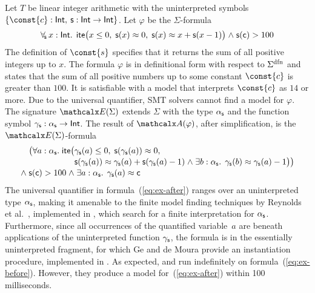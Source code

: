 
\begin{example}
\label{ex:translation}
Let $T$ be linear integer arithmetic
with the uninterpreted symbols  $\{ \const{c} : { \typeint },\allowbreak\> \con{s} : { \typeint \rightarrow \typeint } \}$.
Let $\varphi$ be the $\Sigma$-formula
\begin{equation} \label{eq:ex-before}
\forallf{\con{s}} x : {\typeint}.\;\, \lite\bigl( x \leq 0,\; \con{s}(x) \teq 0,\;
  \con{s}( x ) \teq x + \con{s}( x - 1 ) \bigr) \wedge \con{s}( \con{c} ) > 100
\end{equation}
%
The definition of $\const{s}$ specifies that it returns the sum of all
positive integers up to $x$. The formula $\varphi$ is in definitional form with
respect to $\sfundefs{\Sigma}$
and states that the sum of all
positive numbers up to some constant $\const{c}$ is greater than $100$. It is
satisfiable with a model that interprets $\const{c}$ as $14$ or more.
Due to the universal quantifier, SMT solvers
cannot find
a model for $\varphi$. The signature $\extendsig{\Sigma}$ extends $\Sigma$ with the type
$\alpha_{\mathsf{s}}$ and the %
function symbol $\gamma_{\mathsf{s}} : \alpha_{\mathsf{s}}
\rightarrow \mathsf{Int}$. The result of $\conv( \varphi )$, after simplification,
is the $\extendsig{\Sigma}$-formula
%
\begin{equation} \label{eq:ex-after}
\!\begin{aligned}[c]
  & \phantom{{\wedge}\; }\bigl(
      \forall a : \fargtype{\con{s}}.\; \lite\bigl(
        \!\begin{aligned}[t]
         &  \farg{\con{s}}( a ) \leq 0,\;
          \con{s}(\farg{\con{s}}( a )) \teq 0,\;
\\[-\jot]
  & \con{s}(\farg{\con{s}}( a )) \teq \farg{\con{s}}( a ) + \con{s}( \farg{\con{s}}( a )-1 )
    \wedge \exists b : {\fargtype{\con{s}}}.\;\, \farg{\con{s}}( b ) \teq \farg{\con{s}}( a )-1 \bigr) \bigr)
\end{aligned}
\\[-\jot]
 & {\wedge}\; \con{s}( \con{c} ) > 100 \wedge \exists a : {\fargtype{\con{s}}}.\;\, \farg{\con{s}}( a ) \teq \con{c}
\end{aligned}
\end{equation}
%
The universal quantifier in formula~(\ref{eq:ex-after}) ranges over an uninterpreted
type $\alpha_{\mathsf{s}}$, making it amenable to the finite model finding
techniques by Reynolds et al.\ \cite{ReyEtAl-1-RR-13,reynolds-et-al-2013},
implemented in \cvc, which search for a finite interpretation for $\alpha_{\mathsf{s}}$.
Furthermore, since all occurrences of the quantified variable~$a$ are
beneath applications of the uninterpreted function $\gamma_{\mathsf{s}}$,
the formula is in the essentially uninterpreted fragment,
for which Ge and de Moura \cite{GeDeM-CAV-09} provide
an instantiation procedure, implemented in \ziii.
As expected, \cvc and \ziii run indefinitely on formula~(\ref{eq:ex-before}).
However, they produce a model for~(\ref{eq:ex-after})
within 100 milliseconds.\xend
\end{example}

